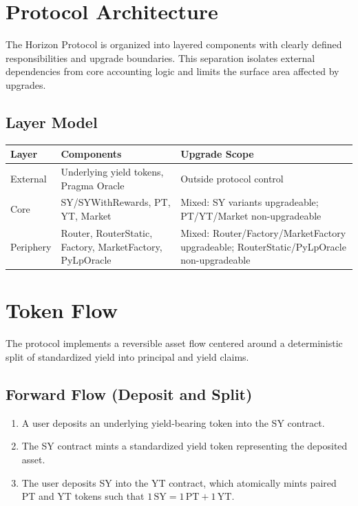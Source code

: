 
\section{Protocol Architecture}

The Horizon Protocol is organized into layered components with clearly defined responsibilities and upgrade boundaries. This separation isolates external dependencies from core accounting logic and limits the surface area affected by upgrades.

\subsection{Layer Model}

\begin{center}
\begin{tabular}{lll}
\toprule
\textbf{Layer} & \textbf{Components} & \textbf{Upgrade Scope} \\
\midrule
External & Underlying yield tokens, Pragma Oracle & Outside protocol control \\
Core & SY/SYWithRewards, PT, YT, Market & Mixed: SY variants upgradeable; PT/YT/Market non-upgradeable \\
Periphery & Router, RouterStatic, Factory, MarketFactory, PyLpOracle & Mixed: Router/Factory/MarketFactory upgradeable; RouterStatic/PyLpOracle non-upgradeable \\
\bottomrule
\end{tabular}
\end{center}

\section{Token Flow}

The protocol implements a reversible asset flow centered around a deterministic split of standardized yield into principal and yield claims.

\subsection{Forward Flow (Deposit and Split)}

\begin{enumerate}
    \item A user deposits an underlying yield-bearing token into the SY contract.
    \item The SY contract mints a standardized yield token representing the deposited asset.
    \item The user deposits SY into the YT contract, which atomically mints paired PT and YT tokens such that $1\,\text{SY} = 1\,\text{PT} + 1\,\text{YT}$.
\end{enumerate}


